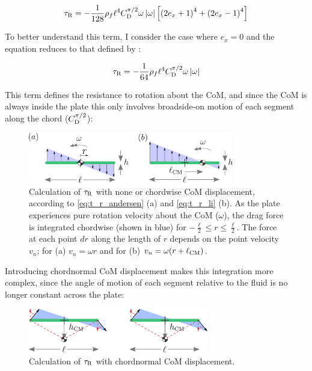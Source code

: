 \documentclass{jfm} %
\begin{document}
\begin{equation}
\tau_\textnormal{R} = -\frac{1}{128}\rho_f\ell^4 C_{\textup{D}}^{\pi /2} \omega  \left| \omega \right| \left [ \left ( 2e_x+1 \right )^4 + \left ( 2e_x-1 \right )^4\right ] \label{eq:t_r_li}
\end{equation}

To better understand this term, I consider the case where $e_x=0$ and the equation reduces to that defined by \cite{andersen2005analysis}:

\begin{equation}
\tau_\textnormal{R} = -\frac{1}{64}\rho_f\ell^4 C_{\textup{D}}^{\pi /2} \omega  \left| \omega \right| \label{eq:t_r_andersen}
\end{equation}

This term defines the resistance to rotation about the CoM, and since the CoM is always inside the plate this only involves broadside-on motion of each segment along the chord ($C_{\textup{D}}^{\pi /2}$):

\begin{figure}
    \centering
    \includegraphics[width=0.8\textwidth]{pics/T_R_diagram1_2.png}
    \caption{Calculation of $\tau_\textnormal{R}$ with none or chordwise CoM displacement, according to \ref{eq:t_r_andersen} (a) and \ref{eq:t_r_li} (b). As the plate experiences pure rotation velocity about the CoM ($\omega$), the drag force is integrated chordwise (shown in blue) for $-\frac{\ell}{2} \le r \le \frac{\ell}{2}$. The force at each point $dr$ along the length of $r$ depends on the point velocity $v_n$; for (a) $v_n = \omega r$ and for (b) $v_n = \omega(r + \ell_{\textup{CM}})$.}
    \label{fig:t_r_diagram_1}
\end{figure}

Introducing chordnormal CoM displacement makes this integration more complex, since the angle of motion of each segment relative to the fluid is no longer constant across the plate:

\begin{figure}
    \centering
    \includegraphics[width=0.7\textwidth]{pics/g12.png}
    \caption{Calculation of $\tau_\textnormal{R}$ with chordnormal CoM displacement.}
    \label{fig:t_r_diagram_2}
\end{figure}
\end{document}
